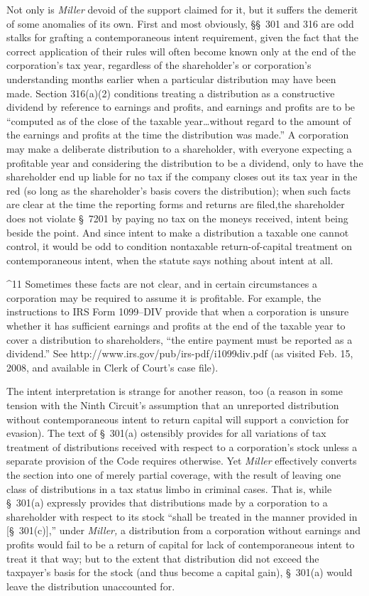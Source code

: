   Not only is \emph{Miller} devoid of the support claimed for it, but
it suffers the demerit of some anomalies of its own. First and
most obviously, \S\S~301 and 316 are odd stalks for grafting a
contemporaneous intent requirement, given the fact that the correct
application of their rules will often become known only at the end
of the corporation's tax year, regardless of the shareholder's
or corporation's understanding months earlier when a particular
distribution may have been made. Section 316(a)(2) conditions treating
a distribution as a constructive dividend by reference to earnings and
profits, and earnings and profits are to be ``computed as of the close
of the taxable year\dots without regard to the amount of the earnings
and profits at the time the distribution was made.'' A corporation may
make a deliberate distribution to a shareholder, with everyone expecting
a profitable year and considering the distribution to be a dividend,
only to have the shareholder end up liable for no tax if the company
closes out its tax year in the red (so long as the shareholder's basis
covers the distribution); when such facts are clear at the time the
reporting forms and returns are filed,\footnotemark[11] the shareholder \newpage 
does not violate \S~7201 by paying no tax on the moneys received,
intent being beside the point. And since intent to make a distribution
a taxable one cannot control, it would be odd to condition nontaxable
return-of-capital treatment on contemporaneous intent, when the statute
says nothing about intent at all.

^11 Sometimes these facts are not clear, and in certain circumstances
a corporation may be required to assume it is profitable. For example,
the instructions to IRS Form 1099--DIV provide that when a corporation
is unsure whether it has sufficient earnings and profits at the end
of the taxable year to cover a distribution to shareholders, ``the
entire payment \newpage  must be reported as a dividend.'' See
http://www.irs.gov/pub/irs-pdf/i1099div.pdf (as visited Feb. 15, 2008,
and available in Clerk of Court's case file).

  The intent interpretation is strange for another reason, too (a reason
in some tension with the Ninth Circuit's assumption that an unreported
distribution without contemporaneous intent to return capital will
support a conviction for evasion). The text of \S~301(a) ostensibly
provides for all variations of tax treatment of distributions received
with respect to a corporation's stock unless a separate provision of
the Code requires otherwise. Yet \emph{Miller} effectively converts the
section into one of merely partial coverage, with the result of leaving
one class of distributions in a tax status limbo in criminal cases.
That is, while \S~301(a) expressly provides that distributions made by
a corporation to a shareholder with respect to its stock ``shall be
treated in the manner provided in [\S~301(c)],'' under \emph{Miller,}
a distribution from a corporation without earnings and profits would
fail to be a return of capital for lack of contemporaneous intent to
treat it that way; but to the extent that distribution did not exceed
the taxpayer's basis for the stock (and thus become a capital gain),
\S~301(a) would leave the distribution unaccounted for.

